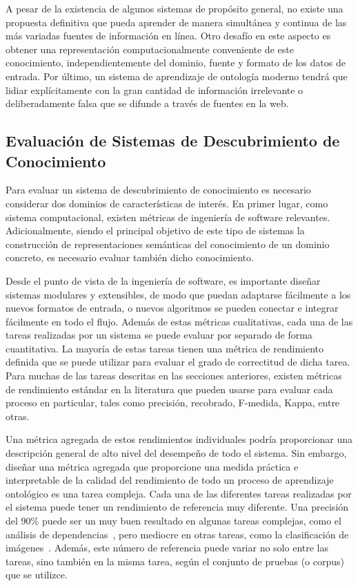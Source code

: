 A pesar de la existencia de algunos sistemas de propósito general, no existe una propuesta definitiva que pueda aprender de manera simultánea y continua de las más variadas fuentes de información en línea.
Otro desafío en este aspecto es obtener una representación computacionalmente conveniente de este conocimiento, independientemente del dominio, fuente y formato de los datos de entrada.
Por último, un sistema de aprendizaje de ontología moderno tendrá que lidiar explícitamente con la gran cantidad de información irrelevante o deliberadamente falsa que se difunde a través de fuentes en la web.

\subsection{Evaluación de Sistemas de Descubrimiento de Conocimiento}\label{sec: evaluación}

Para evaluar un sistema de descubrimiento de conocimiento es necesario considerar dos dominios de características de interés.
En primer lugar, como sistema computacional, existen métricas de ingeniería de software relevantes.
Adicionalmente, siendo el principal objetivo de este tipo de sistemas la construcción de representaciones semánticas del conocimiento de un dominio concreto, es necesario evaluar también dicho conocimiento.

Desde el punto de vista de la ingeniería de software, es importante diseñar sistemas modulares y extensibles, de modo que puedan adaptarse fácilmente a los nuevos formatos de entrada, o nuevos algoritmos se pueden conectar e integrar fácilmente en todo el flujo.
Además de estas métricas cualitativas, cada una de las tareas realizadas por un sistema se puede evaluar por separado de forma cuantitativa.
La mayoría de estas tareas tienen una métrica de rendimiento definida que se puede utilizar para evaluar el grado de correctitud de dicha tarea.
Para muchas de las tareas descritas en las secciones anteriores, existen métricas de rendimiento estándar en la literatura que pueden usarse para evaluar cada proceso en particular, tales como precisión, recobrado, F-medida, Kappa, entre otras.

Una métrica agregada de estos rendimientos individuales podría proporcionar una descripción general de alto nivel del desempeño de todo el sistema.
Sin embargo, diseñar una métrica agregada que proporcione una medida práctica e interpretable de la calidad del rendimiento de todo un proceso de aprendizaje ontológico es una tarea compleja.
Cada una de las diferentes tareas realizadas por el sistema puede tener un rendimiento de referencia muy diferente.
Una precisión del $90\%$ puede ser un muy buen resultado en algunas tareas complejas, como el análisis de dependencias~\cite{AlbertiABCGKKMO17}, pero mediocre en otras tareas, como la clasificación de imágenes~\cite{Russakovsky2015}.
Además, este número de referencia puede variar no solo entre las tareas, sino también en la misma tarea, según el conjunto de pruebas (o corpus) que se utilizce.

